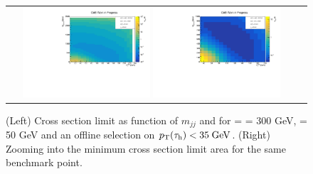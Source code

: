 \begin{figure}[tbh!]
	\centering
	\begin{tabular}{cc}
		\includegraphics[width=0.45\textwidth]{analysis/pics/JetInvMass_vs_MET_xsec_chi300_lsp050_taupt35.pdf}
		\includegraphics[width=0.45\textwidth]{analysis/pics/JetInvMass_vs_MET_xsec_chi300_lsp050_taupt35_zoom.pdf} 		
	\end{tabular}
	\caption{(Left) Cross section limit as function of $m_{jj}$ and \met for \charginopm = \neutralinotwo = 300 GeV, \neutralinoone = 50 GeV and an offline selection on $p_{\text{T}}(\tau_{\text{h}}) <  35\;\text{Ge}\kern-0.06667em\text{V}$. (Right) Zooming into the minimum cross section limit area for the same benchmark point.}
	\label{fig::JetInvMass_vs_MET_xsec_chi300_lsp050_taupt35}
\end{figure}

